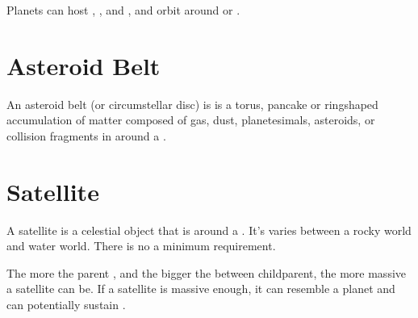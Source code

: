 \documentclass[letterpaper,10pt,english]{sphinxmanual}
\begin{document}
\sphinxAtStartPar
Planets can host {\hyperref[\detokenize{celestial_bodies/satellite:id1}]{}}, {\hyperref[\detokenize{celestial_bodies/trojan:id1}]{}},
and {\hyperref[\detokenize{celestial_bodies/trojan_satellite:id1}]{}}, and orbit around {\hyperref[\detokenize{celestial_bodies/star:id1}]{}}
or {\hyperref[\detokenize{celestial_systems/binary_system:id1}]{}}.


\section{Asteroid Belt}
\label{\detokenize{celestial_bodies/asteroid_belt:asteroid-belt}}\label{\detokenize{celestial_bodies/asteroid_belt::doc}}\label{\detokenize{celestial_bodies/asteroid_belt:id1}}
\sphinxAtStartPar
An asteroid belt (or circumstellar disc) is is a torus,
pancake or ring\sphinxhyphen{}shaped accumulation of matter composed of
gas, dust, planetesimals, asteroids, or collision fragments in {\hyperref[\detokenize{quantities/orbital/orbital:id1}]{}} around a {\hyperref[\detokenize{celestial_bodies/star:id1}]{}}.


\section{Satellite}
\label{\detokenize{celestial_bodies/satellite:satellite}}\label{\detokenize{celestial_bodies/satellite::doc}}\label{\detokenize{celestial_bodies/satellite:id1}}
\sphinxAtStartPar
A satellite is a celestial object that is {\hyperref[\detokenize{quantities/orbital/orbital:id1}]{}}
around a {\hyperref[\detokenize{celestial_bodies/planet:id1}]{}}. It’s {\hyperref[\detokenize{quantities/material/composition_type:id1}]{}}
varies between a rocky world and water world.
There is no a minimum {\hyperref[\detokenize{quantities/material/mass:id1}]{}} requirement.

\sphinxAtStartPar
The more {\hyperref[\detokenize{quantities/material/mass:id1}]{}} the parent {\hyperref[\detokenize{celestial_bodies/planet:id1}]{}},
and the bigger the {\hyperref[\detokenize{quantities/orbital/semi_major_axis:id1}]{}} between child\sphinxhyphen{}parent,
the more massive a satellite can be.
If a satellite is massive enough, it can resemble a planet and can
potentially sustain {\hyperref[\detokenize{quantities/habitability/habitability:id1}]{}}.
\end{document}
